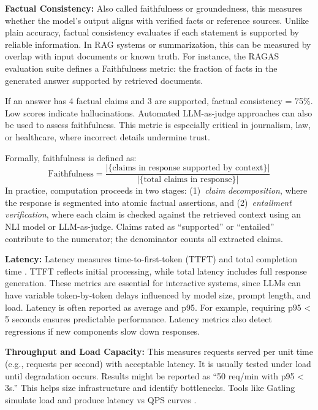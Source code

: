 \textbf{Factual Consistency:} Also called faithfulness or groundedness, this measures whether the model’s output aligns with verified facts or reference sources. Unlike plain accuracy, factual consistency evaluates if each statement is supported by reliable information. In RAG systems or summarization, this can be measured by overlap with input documents or known truth. For instance, the RAGAS evaluation suite defines a Faithfulness metric: the fraction of facts in the generated answer supported by retrieved documents.  

If an answer has 4 factual claims and 3 are supported, factual consistency = 75\%. Low scores indicate hallucinations. Automated LLM-as-judge approaches can also be used to assess faithfulness. This metric is especially critical in journalism, law, or healthcare, where incorrect details undermine trust.

Formally, faithfulness is defined as:
\begin{equation}
\text{Faithfulness} = \frac{|\{\text{claims in response supported by context}\}|}{|\{\text{total claims in response}\}|}
\label{eq:faithfulness}
\end{equation}
In practice, computation proceeds in two stages: (1)~\emph{claim decomposition}, where the response is segmented into atomic factual assertions, and (2)~\emph{entailment verification}, where each claim is checked against the retrieved context using an NLI model or LLM-as-judge. Claims rated as ``supported'' or ``entailed'' contribute to the numerator; the denominator counts all extracted claims.

\textbf{Latency:} Latency measures time-to-first-token (TTFT) and total completion time \cite{posta1}. TTFT reflects initial processing, while total latency includes full response generation. These metrics are essential for interactive systems, since LLMs can have variable token-by-token delays influenced by model size, prompt length, and load. Latency is often reported as average and p95. For example, requiring p95 < 5 seconds ensures predictable performance. Latency metrics also detect regressions if new components slow down responses.  

\textbf{Throughput and Load Capacity:} This measures requests served per unit time (e.g., requests per second) with acceptable latency. It is usually tested under load until degradation occurs. Results might be reported as “50 req/min with p95 < 3s.” This helps size infrastructure and identify bottlenecks. Tools like Gatling simulate load and produce latency vs QPS curves \cite{gatling}.  

